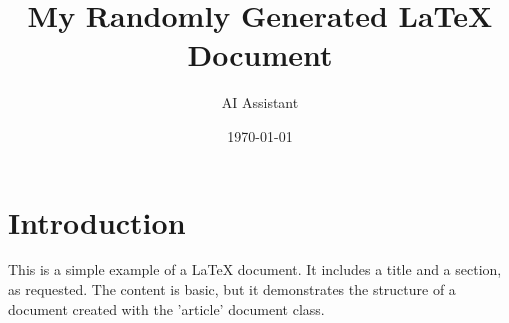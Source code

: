 \documentclass{article}
\title{My Randomly Generated LaTeX Document}
\author{AI Assistant}
\date{\today}
\begin{document}
\maketitle

\section{Introduction}
This is a simple example of a LaTeX document. It includes a title and a section, as requested. The content is basic, but it demonstrates the structure of a document created with the 'article' document class.
\end{document}
